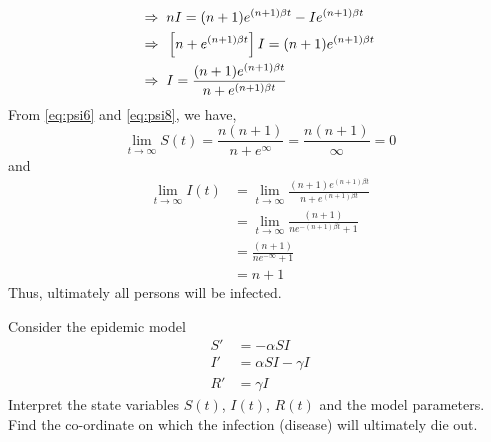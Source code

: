 \documentclass[../main-sheet.tex]{subfiles}
\begin{document}
\begin{soln}
\begin{align}
        \Rightarrow\;\;&{nI}=(n+1)e^{(n+1) \beta t}-Ie^{(n+1) \beta t}\notag\\
        \Rightarrow\;\;&\left[ n+e^{(n+1) \beta t} \right]I=(n+1)e^{(n+1) \beta t}\notag\\
        \Rightarrow\;\;&I=\frac{(n+1)e^{(n+1) \beta t}}{n+e^{(n+1) \beta t} }\label{eq:psi8}
    \end{align}
    From \eqref{eq:psi6} and \eqref{eq:psi8}, we have,
    \[
        \lim_{t\to \infty}S(t)=\frac{n(n+1)}{n+e^\infty}=\frac{n(n+1)}{\infty}=0
    \]
    and
    \begin{align*}
        \lim_{t\to \infty}I(t)&=\lim_{t\to \infty}\frac{(n+1)e^{(n+1) \beta t}}{n+e^{(n+1) \beta t} }\\
        &=\lim_{t\to \infty}\frac{(n+1)}{ne^{-(n+1) \beta t} +1}\\
        &=\frac{(n+1)}{ne^{-\infty} +1}\\
        &=n+1
    \end{align*}
    Thus, ultimately all persons will be infected.
\end{soln}
\begin{prob}
    Consider the epidemic model
    \begin{align*}
        S'&=-\alpha SI\\
        I'&=\alpha SI-\gamma I\\
        R'&=\gamma I
    \end{align*}
    Interpret the state variables \(S(t)\), \(I(t)\), \(R(t)\) and the model parameters.\\
    Find the co-ordinate on which the infection (disease) will ultimately die out.
\end{prob}
\end{document}
